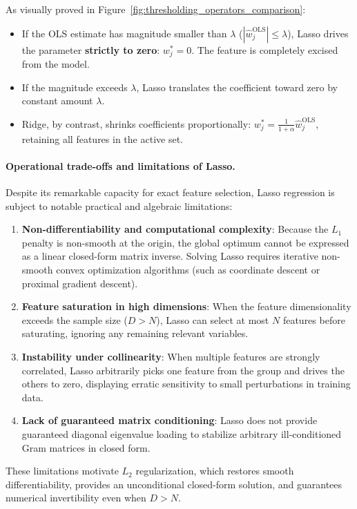 As visually proved in Figure~\ref{fig:thresholding_operators_comparison}:
\begin{itemize}[noitemsep,topsep=2pt,parsep=0pt,partopsep=0pt]
  \item If the OLS estimate has magnitude smaller than $\lambda$ ($|\hat{w}_j^{\text{OLS}}| \le \lambda$), Lasso drives the parameter \textbf{strictly to zero}: $w_j^* = 0$. The feature is completely excised from the model.
  \item If the magnitude exceeds $\lambda$, Lasso translates the coefficient toward zero by constant amount $\lambda$.
  \item Ridge, by contrast, shrinks coefficients proportionally: $w_j^* = \frac{1}{1 + \alpha} \hat{w}_j^{\text{OLS}}$, retaining all features in the active set.
\end{itemize}

\paragraph{Operational trade-offs and limitations of Lasso.}
Despite its remarkable capacity for exact feature selection, Lasso regression is subject to notable practical and algebraic limitations:
\begin{enumerate}[noitemsep,topsep=2pt,parsep=0pt,partopsep=0pt]
  \item \textbf{Non-differentiability and computational complexity}: Because the $L_1$ penalty is non-smooth at the origin, the global optimum cannot be expressed as a linear closed-form matrix inverse. Solving Lasso requires iterative non-smooth convex optimization algorithms (such as coordinate descent or proximal gradient descent).
  \item \textbf{Feature saturation in high dimensions}: When the feature dimensionality exceeds the sample size ($D > N$), Lasso can select at most $N$ features before saturating, ignoring any remaining relevant variables.
  \item \textbf{Instability under collinearity}: When multiple features are strongly correlated, Lasso arbitrarily picks one feature from the group and drives the others to zero, displaying erratic sensitivity to small perturbations in training data.
  \item \textbf{Lack of guaranteed matrix conditioning}: Lasso does not provide guaranteed diagonal eigenvalue loading to stabilize arbitrary ill-conditioned Gram matrices in closed form.
\end{enumerate}
These limitations motivate $L_2$ regularization, which restores smooth differentiability, provides an unconditional closed-form solution, and guarantees numerical invertibility even when $D > N$.

